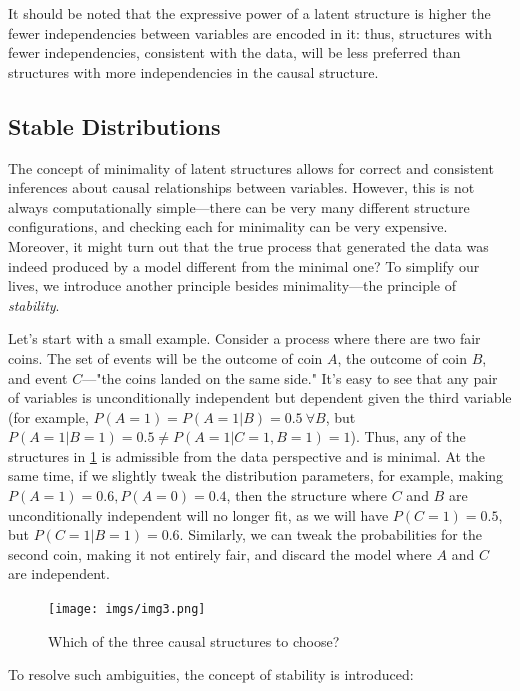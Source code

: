 \documentclass[fleqn]{article}
\numberwithin{equation}{section}
\numberwithin{theorem}{section}
\numberwithin{figure}{section}
\numberwithin{lemma}{section}
\numberwithin{corollary}{section}
\begin{document}
It should be noted that the expressive power of a latent structure is higher the fewer independencies between variables are encoded in it: thus, structures with fewer independencies, consistent with the data, will be less preferred than structures with more independencies in the causal structure.

\subsection*{Stable Distributions}

The concept of minimality of latent structures allows for correct and consistent inferences about causal relationships between variables. However, this is not always computationally simple—there can be very many different structure configurations, and checking each for minimality can be very expensive. Moreover, it might turn out that the true process that generated the data was indeed produced by a model different from the minimal one? To simplify our lives, we introduce another principle besides minimality—the principle of \textit{stability}.

Let's start with a small example. Consider a process where there are two fair coins. The set of events will be the outcome of coin $A$, the outcome of coin $B$, and event $C$—"the coins landed on the same side." It's easy to see that any pair of variables is unconditionally independent but dependent given the third variable (for example, $P(A=1) = P(A=1|B) = 0.5\ \forall B$, but $P(A=1|B=1) =0.5\neq P(A=1|C=1,B=1) = 1$). Thus, any of the structures in \ref{fig:choice} is admissible from the data perspective and is minimal. At the same time, if we slightly tweak the distribution parameters, for example, making $P(A=1) = 0.6, P(A=0)=0.4$, then the structure where $C$ and $B$ are unconditionally independent will no longer fit, as we will have $P(C=1) = 0.5$, but $P(C=1|B=1) = 0.6$. Similarly, we can tweak the probabilities for the second coin, making it not entirely fair, and discard the model where $A$ and $C$ are independent.

\begin{figure}[h]
	\begin{center}
		\texttt{[image: imgs/img3.png]}
	\end{center}
	\caption{Which of the three causal structures to choose?}
	\label{fig:choice}
\end{figure}

To resolve such ambiguities, the concept of stability is introduced:
\end{document}
